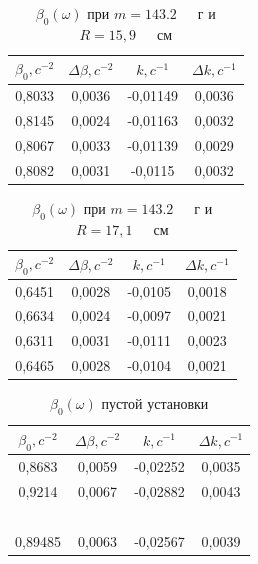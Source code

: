 \documentclass[a4paper,12pt]{article} %
\begin{document}
\begin{table}[!ht]
    \centering
    \begin{tabular}{|c|c|c|c|}
    \hline
        $\beta_0, c^{-2}$ & $\Delta \beta, c^{-2}$ & $k, c^{-1}$ & $\Delta k, c^{-1}$ \\ \hline
        0,8033 & 0,0036 & -0,01149 & 0,0036  \\ \hline
        0,8145 & 0,0024 & -0,01163 & 0,0032  \\ \hline
        0,8067 & 0,0033 & -0,01139 & 0,0029  \\ \hline
        0,8082 & 0,0031 & -0,0115 & 0,0032  \\ \hline
    \end{tabular}
    \caption{$\beta_0(\omega)$ при $m=143.2$~~~г и $R= 15,9$~~~см}
\end{table}
\begin{table}[!ht]
    \centering
    \begin{tabular}{|c|c|c|c|}
    \hline
        $\beta_0, c^{-2}$ & $\Delta \beta, c^{-2}$ & $k, c^{-1}$ & $\Delta k, c^{-1}$ \\ \hline
        0,6451 & 0,0028 & -0,0105 & 0,0018  \\ \hline
        0,6634 & 0,0024 & -0,0097 & 0,0021  \\ \hline
        0,6311 & 0,0031 & -0,0111 & 0,0023  \\ \hline
        0,6465 & 0,0028 & -0,0104 & 0,0021  \\ \hline
    \end{tabular}
    \caption{$\beta_0(\omega)$ при $m=143.2$~~~г и $R= 17,1$~~~см}
\end{table}
\begin{table}[!ht]
    \centering
    \begin{tabular}{|c|c|c|c|}
    \hline
        $\beta_0, c^{-2}$ & $\Delta \beta, c^{-2}$ & $k, c^{-1}$ & $\Delta k, c^{-1}$ \\ \hline
        0,8683 & 0,0059 & -0,02252 & 0,0035  \\ \hline
        0,9214 & 0,0067 & -0,02882 & 0,0043  \\ \hline
        ~~~ & ~~~ & ~~~ &   \\ \hline
        0,89485 & 0,0063 & -0,02567 & 0,0039  \\ \hline
    \end{tabular}
    \caption{$\beta_0(\omega)$ пустой установки}
\end{table}
\end{document}
